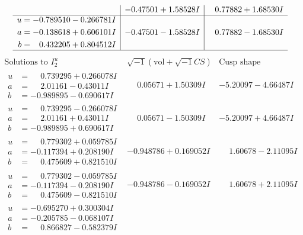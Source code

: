 \documentclass[1p]{elsarticle_modified}
\theoremstyle{definition}
\newcommand{\I}{\sqrt{-1}}
\begin{document}
$$\begin{array}{c|c|c}
 & -0.47501 + 1.58528 I & \phantom{-}0.77882 + 1.68530 I \\ \hline\begin{aligned}
u &= -0.789510 - 0.266781 I \\
a &= -0.138618 + 0.606101 I \\
b &= \phantom{-}0.432205 + 0.804512 I\end{aligned}
 & -0.47501 - 1.58528 I & \phantom{-}0.77882 - 1.68530 I\\
 \hline 
 \end{array}$$\newpage$$\begin{array}{c|c|c}  
\text{Solutions to }I^u_{2}& \I (\text{vol} + \sqrt{-1}CS) & \text{Cusp shape}\\
 \hline 
\begin{aligned}
u &= \phantom{-}0.739295 + 0.266078 I \\
a &= \phantom{-}2.01161 - 0.43011 I \\
b &= -0.989895 - 0.690617 I\end{aligned}
 & \phantom{-}0.05671 + 1.50309 I & -5.20097 - 4.66487 I \\ \hline\begin{aligned}
u &= \phantom{-}0.739295 - 0.266078 I \\
a &= \phantom{-}2.01161 + 0.43011 I \\
b &= -0.989895 + 0.690617 I\end{aligned}
 & \phantom{-}0.05671 - 1.50309 I & -5.20097 + 4.66487 I \\ \hline\begin{aligned}
u &= \phantom{-}0.779302 + 0.059785 I \\
a &= -0.117394 + 0.208190 I \\
b &= \phantom{-}0.475609 + 0.821510 I\end{aligned}
 & -0.948786 + 0.169052 I & \phantom{-}1.60678 - 2.11095 I \\ \hline\begin{aligned}
u &= \phantom{-}0.779302 - 0.059785 I \\
a &= -0.117394 - 0.208190 I \\
b &= \phantom{-}0.475609 - 0.821510 I\end{aligned}
 & -0.948786 - 0.169052 I & \phantom{-}1.60678 + 2.11095 I \\ \hline\begin{aligned}
u &= -0.695270 + 0.300304 I \\
a &= -0.205785 - 0.068107 I \\
b &= \phantom{-}0.866827 - 0.582379 I\end{aligned}

\end{array}$$
\end{document}
